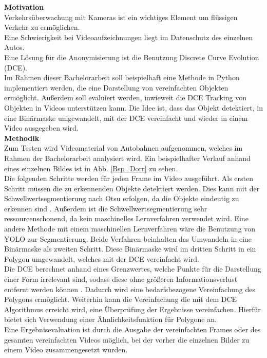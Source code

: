 \documentclass[a4paper,11pt,pdftex, parskip]{scrreprt}
\begin{document}
{\bfseries \large Motivation\\}
Verkehrsüberwachung mit Kameras ist ein wichtiges Element um flüssigen Verkehr zu ermöglichen. \\
Eine Schwierigkeit bei Videoaufzeichnungen liegt im Datenschutz des einzelnen Autos.  \\
Eine Lösung für die Anonymisierung ist die Benutzung Discrete Curve Evolution (DCE).\\
Im Rahmen dieser Bachelorarbeit soll beispielhaft eine Methode in Python implementiert werden, die eine Darstellung von vereinfachten Objekten ermöglicht. Außerdem soll evaluiert werden, inwieweit die DCE Tracking von Objekten in Videos unterstützen kann.
Die Idee ist, dass das Objekt detektiert, in eine Binärmaske umgewandelt, mit der DCE vereinfacht und wieder in einem Video ausgegeben wird.\\%
{\bfseries \large Methodik\\}
Zum Testen wird Videomaterial von Autobahnen aufgenommen, welches im Rahmen der Bachelorarbeit analysiert wird. Ein beispielhafter Verlauf anhand eines einzelnen Bildes ist in Abb. \ref{Bsp_Dorr} zu sehen. \\
Die folgenden Schritte werden für jeden Frame im Video ausgeführt. 
Als ersten Schritt müssen die zu erkennenden Objekte detektiert werden. Dies kann mit der Schwellwertsegmentierung nach Otsu erfolgen, da die Objekte eindeutig zu erkennen sind \citep{Otsu1979}. Außerdem ist die Schwellwertsegmentierung sehr ressourcenschonend, da kein maschinelles Lernverfahren verwendet wird. Eine andere Methode mit einem maschinellen Lernverfahren wäre die Benutzung von YOLO zur Segmentierung. Beide Verfahren beinhalten das Umwandeln in eine Binärmaske als zweiten Schritt. Diese Binärmaske wird im dritten Schritt in ein Polygon umgewandelt, welches mit der DCE vereinfacht wird. \\
Die DCE berechnet anhand eines Grenzwertes, welche Punkte für die Darstellung einer Form irrelevant sind, sodass diese ohne größeren Informationsverlust entfernt werden können \citep{Barkowsky2000}. Dadurch wird eine bedarfsbezogene Vereinfachung des Polygons ermöglicht. 
Weiterhin kann die Vereinfachung die mit dem DCE Algorithmus erreicht wird, eine Überprüfung der Ergebnisse vereinfachen. Hierfür bietet sich Verwendung einer Ähnlichkeitsfunktion für Polygone an. \\
Eine Ergebnisevaluation ist durch die Ausgabe der vereinfachten Frames  oder des gesamten vereinfachten Videos möglich, bei der vorher die einzelnen Bilder zu einem Video zusammengesetzt wurden. \\
\end{document}
